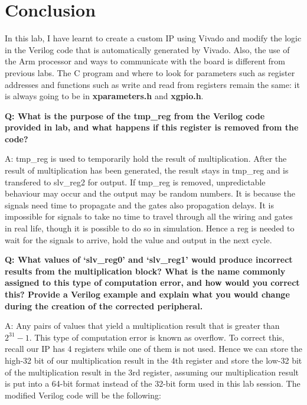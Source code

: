 \documentclass[11pt,letterpaper,titlepage]{article}
\begin{document}
\part{Conclusion}

In this lab, I have learnt to create a custom IP using Vivado and modify the logic in the Verilog code that is automatically generated by Vivado. Also, the use of the Arm processor and ways to communicate with the board is different from previous labs. The C program and where to look for parameters such as register addresses and functions such as write and read from registers remain the same: it is always going to be in \textbf{xparameters.h} and \textbf{xgpio.h}.

\textbf{Q: What is the purpose of the tmp\_reg from the Verilog code provided in lab, and what happens if
this register is removed from the code?}

A: tmp\_reg is used to temporarily hold the result of multiplication. After the result of multiplication has been generated, the result stays in tmp\_reg  and is transfered to slv\_reg2 for output. If tmp\_reg is removed, unpredictable behaviour may occur and the output may be random numbers. It is because the signals need time to propagate and the gates also propagation delays. It is impossible for signals to take no time to travel through all the wiring and gates in real life, though it is possible to do so in simulation. Hence a reg is needed to wait for the signals to arrive, hold the value and output in the next cycle.

\textbf{Q: What values of ‘slv\_reg0’ and ‘slv\_reg1’ would produce incorrect results from the multiplication
block? What is the name commonly assigned to this type of computation error, and how would
you correct this? Provide a Verilog example and explain what you would change during the
creation of the corrected peripheral.}

A: Any pairs of values that yield a multiplication result that is greater than $2^{31}-1$. This type of computation error is known as overflow. To correct this, recall our IP has 4 registers while one of them is not used. Hence we can store the high-32 bit of our multiplication result in the 4th register and store the low-32 bit of the multiplication result in the 3rd register, assuming our multiplication result is put into a 64-bit format instead of the 32-bit form used in this lab session. The modified Verilog code will be the following:


\end{document}

